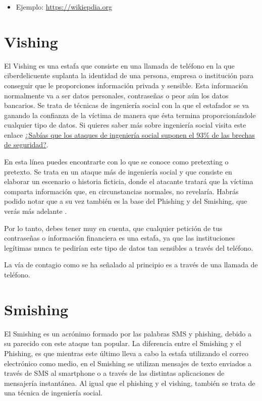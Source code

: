 \documentclass[
  spanish,
  a4paper,
  openany]{book}
\providecommand{\tightlist}{%
  \setlength{\itemsep}{0pt}\setlength{\parskip}{0pt}}
\begin{document}
\begin{itemize}
\tightlist
\item
  Ejemplo: \url{https://wikiepdia.org}
\end{itemize}

\hypertarget{vishing}{%
\section{Vishing}\label{vishing}}

El Vishing es una estafa que consiste en una llamada de teléfono en la que ciberdelicuente suplanta la identidad de una persona, empresa o institución para conseguir que le proporciones información privada y sensible. Esta información normalmente va a ser datos personales, contraseñas o peor aún los datos bancarios. Se trata de técnicas de ingeniería social con la que el estafador se va ganando la confianza de la víctima de manera que ésta termina proporcionándole cualquier tipo de datos. Si quieres saber más sobre ingeniería social visita este enlace \href{https://www.osi.es/es/actualidad/blog/2019/12/04/sabias-que-los-ataques-de-ingenieria-social-suponen-el-93-de-las-brechas}{¿Sabías que los ataques de ingeniería social suponen el 93\% de las brechas de seguridad?}.

En esta línea puedes encontrarte con lo que se conoce como pretexting o pretexto. Se trata en un ataque más de ingeniería social y que consiste en elaborar un
escenario o historia ficticia, donde el atacante tratará que la víctima comparta información que, en circunstancias normales, no revelaría. Habrás podido notar que a su vez también es la base del Phishing y del Smishing, que verás más adelante \citep{RZ-pretexting}.

Por lo tanto, debes tener muy en cuenta, que cualquier petición de tus contraseñas o información financiera es una estafa, ya que las instituciones legítimas nunca te pedirían este tipo de datos tan sensibles a través del teléfono.

La vía de contagio como se ha señalado al principio es a través de una llamada de teléfono.

\hypertarget{smishing}{%
\section{Smishing}\label{smishing}}

El Smishing es un acrónimo formado por las palabras SMS y phishing, debido a su parecido con este ataque tan popular. La diferencia entre el Smishing y el Phishing, es que mientras este último lleva a cabo la estafa utilizando el correo electrónico como medio, en el Smishing se utilizan mensajes de texto enviados a través de SMS al smartphone o a través de las distintas aplicaciones de mensajería instantánea. Al igual que el phishing y el vishing, también se trata de una técnica de ingeniería social.
\end{document}
